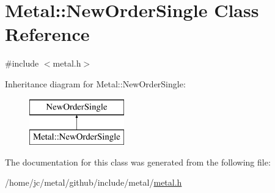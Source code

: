\hypertarget{classMetal_1_1NewOrderSingle}{}\section{Metal\+:\+:New\+Order\+Single Class Reference}
\label{classMetal_1_1NewOrderSingle}


{\ttfamily \#include $<$metal.\+h$>$}

Inheritance diagram for Metal\+:\+:New\+Order\+Single\+:\begin{figure}[H]
\begin{center}
\leavevmode
\includegraphics[height=2.000000cm]{classMetal_1_1NewOrderSingle}
\end{center}
\end{figure}


The documentation for this class was generated from the following file\+:\begin{DoxyCompactItemize}
\item 
/home/jc/metal/github/include/metal/\hyperlink{metal_8h}{metal.\+h}\end{DoxyCompactItemize}
